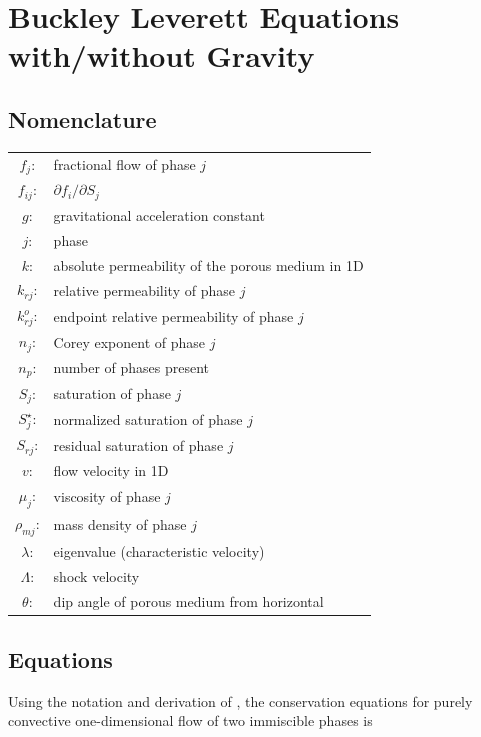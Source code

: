
\section{Buckley Leverett Equations with/without Gravity}

\subsection{Nomenclature}
\begin{tabular}{c l}
%
$f_{j}$: & fractional flow of phase $j$ \\
%
$f_{ij}$: & $\partial f_{i}/\partial S_{j}$ \\
%
$g$: & gravitational acceleration constant \\
%
$j$: & phase \\
%
$k$: & absolute permeability of the porous medium in 1D \\
%
$k_{rj}$:& relative permeability of phase $j$ \\
%
$k^{o}_{rj}$: & endpoint relative permeability of phase $j$ \\
%
$n_{j}$: & Corey exponent of phase $j$\\
%
$n_{p}$: & number of phases present\\
%
$S_{j}$: & saturation of phase $j$\\
%
$S_{j}^{\star}$: & normalized saturation of phase $j$\\
%
$S_{rj}$: & residual saturation of phase $j$\\
%
$v$: & flow velocity in 1D\\
%
$\mu_{j}$: & viscosity of phase $j$\\
%
$\rho_{mj}$: & mass density of phase $j$\\
%
$\lambda$: & eigenvalue (characteristic velocity)\\
%
$\Lambda$: & shock velocity\\
%
$\theta$: & dip angle of porous medium from horizontal\\
%
\end{tabular}



\subsection{Equations}

Using the notation and derivation of \cite{Orr_2007}, the conservation equations for purely convective one-dimensional flow of two immiscible phases is

